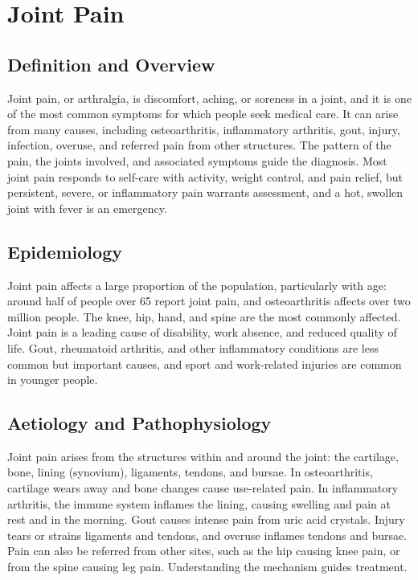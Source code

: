 \chapter{Joint Pain}

\section*{Definition and Overview}
Joint pain, or arthralgia, is discomfort, aching, or soreness in a joint, and it is one of the most common symptoms for which people seek medical care. It can arise from many causes, including osteoarthritis, inflammatory arthritis, gout, injury, infection, overuse, and referred pain from other structures. The pattern of the pain, the joints involved, and associated symptoms guide the diagnosis. Most joint pain responds to self-care with activity, weight control, and pain relief, but persistent, severe, or inflammatory pain warrants assessment, and a hot, swollen joint with fever is an emergency.

\section*{Epidemiology}
Joint pain affects a large proportion of the population, particularly with age: around half of people over 65 report joint pain, and osteoarthritis affects over two million people. The knee, hip, hand, and spine are the most commonly affected. Joint pain is a leading cause of disability, work absence, and reduced quality of life. Gout, rheumatoid arthritis, and other inflammatory conditions are less common but important causes, and sport and work-related injuries are common in younger people.

\section*{Aetiology and Pathophysiology}
Joint pain arises from the structures within and around the joint: the cartilage, bone, lining (synovium), ligaments, tendons, and bursae. In osteoarthritis, cartilage wears away and bone changes cause use-related pain. In inflammatory arthritis, the immune system inflames the lining, causing swelling and pain at rest and in the morning. Gout causes intense pain from uric acid crystals. Injury tears or strains ligaments and tendons, and overuse inflames tendons and bursae. Pain can also be referred from other sites, such as the hip causing knee pain, or from the spine causing leg pain. Understanding the mechanism guides treatment.

